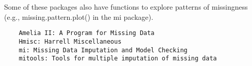 \documentclass[MASTER.tex]{subfiles}
\begin{document}
 
	
	\begin{frame}
	Some of these packages also have functions to explore patterns of missingness (e.g., missing.pattern.plot() in the mi package).
\begin{verbatim}	
	Amelia II: A Program for Missing Data
	Hmisc: Harrell Miscellaneous
	mi: Missing Data Imputation and Model Checking
	mitools: Tools for multiple imputation of missing data
\end{verbatim}
\end{frame}	
\end{document}
